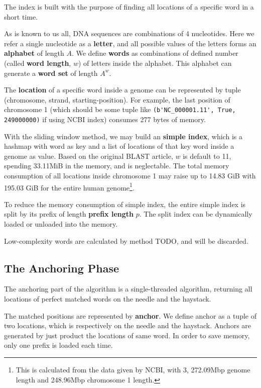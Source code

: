 \documentclass[10pt,final,journal,twocolumn,a4paper]{IEEEtran}
\begin{document}
The index is built with the purpose of finding all locations of a specific word in a short time.

As is known to us all, DNA sequences are combinations of 4 nucleotides. Here we refer a single nucleotide as a \textbf{letter}, and all possible values of the letters forms an \textbf{alphabet} of length $A$. We define \textbf{words} as combinations of defined number (called \textbf{word length}, $w$) of letters inside the alphabet. This alphabet can generate a \textbf{word set} of length $A^{w}$.

The \textbf{location} of a specific word inside a genome can be represented by tuple (chromosome, strand, starting-position). For example, the last position of chromosome 1 (which should be some tuple like \verb|(b'NC_000001.11', True, 249000000)| if using NCBI index) consumes 277 bytes of memory.


With the sliding window method, we may build an \textbf{simple index}, which is a hashmap with word as key and a list of locations of that key word inside a genome as value. Based on the original BLAST article, $w$ is default to 11, spending 33.11MiB in the memory, and is neglectable. The total memory consumption of all locations inside chromosome 1 may raise up to 14.83 GiB with 195.03 GiB for the entire human genome\footnote{This is calculated from the data given by NCBI, with 3, 272.09Mbp genome length and 248.96Mbp chromosome 1 length.}.

To reduce the memory consumption of simple index, the entire simple index is split by its prefix of length \textbf{prefix length} $p$. The split index can be dynamically loaded or unloaded into the memory.

Low-complexity words are calculated by method TODO, and will be discarded.

\subsection{The \textbf{Anchoring} Phase}

The anchoring part of the algorithm is a single-threaded algorithm, returning all locations of perfect matched words on the needle and the haystack.

The matched positions are represented by \textbf{anchor}. We define anchor as a tuple of two locations, which is respectively on the needle and the haystack. Anchors are generated by just product the locations of same word. In order to save memory, only one prefix is loaded each time.
\end{document}
